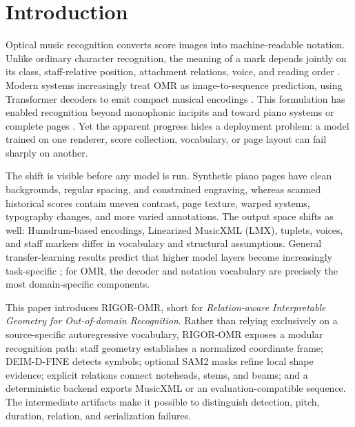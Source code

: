 \section{Introduction}
Optical music recognition converts score images into machine-readable notation. Unlike ordinary character recognition, the meaning of a mark depends jointly on its class, staff-relative position, attachment relations, voice, and reading order \cite{calvozaragoza2021understanding,rebelo2012optical}. Modern systems increasingly treat OMR as image-to-sequence prediction, using Transformer decoders to emit compact musical encodings \cite{vaswani2017attention,riosvila2024smt,li2023tromr}. This formulation has enabled recognition beyond monophonic incipits and toward piano systems or complete pages \cite{riosvila2023grandstaff,riosvila2026fullpage}. Yet the apparent progress hides a deployment problem: a model trained on one renderer, score collection, vocabulary, or page layout can fail sharply on another.

The shift is visible before any model is run. Synthetic piano pages have clean backgrounds, regular spacing, and constrained engraving, whereas scanned historical scores contain uneven contrast, page texture, warped systems, typography changes, and more varied annotations. The output space shifts as well: Humdrum-based encodings, Linearized MusicXML (LMX), tuplets, voices, and staff markers differ in vocabulary and structural assumptions. General transfer-learning results predict that higher model layers become increasingly task-specific \cite{pan2010transfer,yosinski2014transferable}; for OMR, the decoder and notation vocabulary are precisely the most domain-specific components.

This paper introduces RIGOR-OMR, short for \emph{Relation-aware Interpretable Geometry for Out-of-domain Recognition}. Rather than relying exclusively on a source-specific autoregressive vocabulary, RIGOR-OMR exposes a modular recognition path: staff geometry establishes a normalized coordinate frame; DEIM-D-FINE detects symbols; optional SAM2 masks refine local shape evidence; explicit relations connect noteheads, stems, and beams; and a deterministic backend exports MusicXML or an evaluation-compatible sequence. The intermediate artifacts make it possible to distinguish detection, pitch, duration, relation, and serialization failures.

